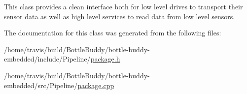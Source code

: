 This class provides a clean interface both for low level drives to transport their sensor data as well as high level services to read data from low level sensors. 

The documentation for this class was generated from the following files\+:\begin{DoxyCompactItemize}
\item 
/home/travis/build/\+Bottle\+Buddy/bottle-\/buddy-\/embedded/include/\+Pipeline/\hyperlink{package_8h}{package.\+h}\item 
/home/travis/build/\+Bottle\+Buddy/bottle-\/buddy-\/embedded/src/\+Pipeline/\hyperlink{package_8cpp}{package.\+cpp}\end{DoxyCompactItemize}

